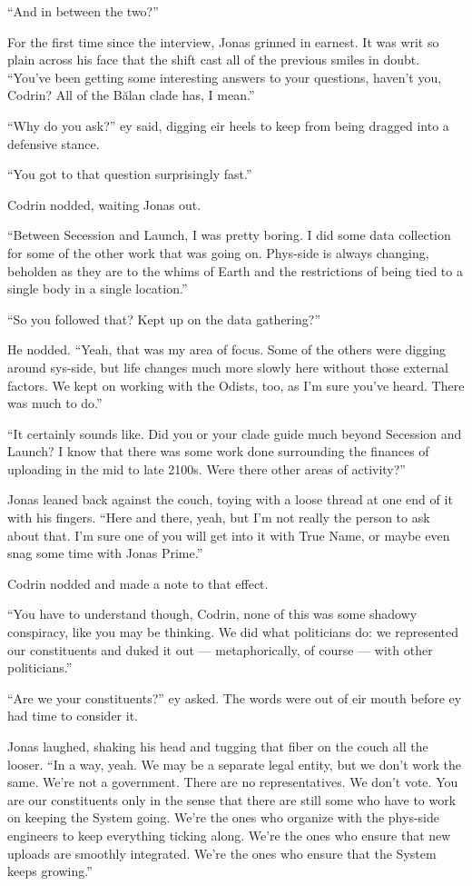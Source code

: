 ``And in between the two?''

For the first time since the interview, Jonas grinned in earnest. It was writ so plain across his face that the shift cast all of the previous smiles in doubt. ``You've been getting some interesting answers to your questions, haven't you, Codrin? All of the Bălan clade has, I mean.''

``Why do you ask?'' ey said, digging eir heels to keep from being dragged into a defensive stance.

``You got to that question surprisingly fast.''

Codrin nodded, waiting Jonas out.

``Between Secession and Launch, I was pretty boring. I did some data collection for some of the other work that was going on. Phys-side is always changing, beholden as they are to the whims of Earth and the restrictions of being tied to a single body in a single location.''

``So you followed that? Kept up on the data gathering?''

He nodded. ``Yeah, that was my area of focus. Some of the others were digging around sys-side, but life changes much more slowly here without those external factors. We kept on working with the Odists, too, as I'm sure you've heard. There was much to do.''

``It certainly sounds like. Did you or your clade guide much beyond Secession and Launch? I know that there was some work done surrounding the finances of uploading in the mid to late 2100s. Were there other areas of activity?''

Jonas leaned back against the couch, toying with a loose thread at one end of it with his fingers. ``Here and there, yeah, but I'm not really the person to ask about that. I'm sure one of you will get into it with True Name, or maybe even snag some time with Jonas Prime.''

Codrin nodded and made a note to that effect.

``You have to understand though, Codrin, none of this was some shadowy conspiracy, like you may be thinking. We did what politicians do: we represented our constituents and duked it out — metaphorically, of course — with other politicians.''

``Are we your constituents?'' ey asked. The words were out of eir mouth before ey had time to consider it.

Jonas laughed, shaking his head and tugging that fiber on the couch all the looser. ``In a way, yeah. We may be a separate legal entity, but we don't work the same. We're not a government. There are no representatives. We don't vote. You are our constituents only in the sense that there are still some who have to work on keeping the System going. We're the ones who organize with the phys-side engineers to keep everything ticking along. We're the ones who ensure that new uploads are smoothly integrated. We're the ones who ensure that the System keeps growing.''

